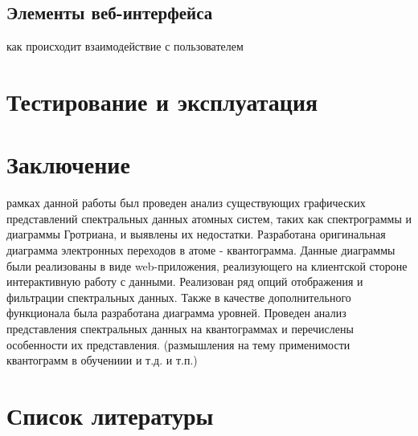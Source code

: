 \documentclass[a4paper, 12pt]{article}
\let\stdsection\section
\renewcommand\section{\newpage\stdsection}
\begin{document}
  \subsection{Элементы веб-интерфейса}
  как происходит взаимодействие с пользователем
\section{Тестирование и эксплуатация}


\section*{Заключение}
     рамках данной работы был проведен анализ существующих графических представлений спектральных данных атомных систем, таких как спектрограммы и диаграммы Гротриана, и выявлены их недостатки. Разработана оригинальная диаграмма электронных переходов в атоме - квантограмма.  Данные диаграммы были реализованы в виде web-приложения, реализующего на клиентской стороне интерактивную работу с данными. Реализован ряд опций отображения и фильтрации спектральных данных. Также в качестве дополнительного функционала была разработана диаграмма уровней. Проведен анализ представления спектральных данных на квантограммах и перечислены особенности их представления. (размышления на тему применимости квантограмм в обучениии и т.д. и т.п.)

\section*{Список литературы}
\end{document}
